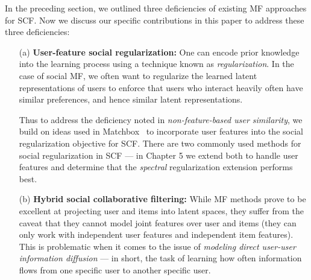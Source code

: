 In the preceding section, we outlined three deficiencies of existing MF
approaches for SCF.  Now we discuss our specific
contributions in this paper to address these three deficiencies:
\begin{enumerate}
\item[(a)] {\bf User-feature social regularization:} One can encode
prior knowledge into the learning process using a technique known as
\emph{regularization}.  In the case of social MF, we often want to
regularize the learned latent representations of users to enforce that
users who interact heavily often have similar preferences, and hence
similar latent representations.  

Thus to address the deficiency noted in
\emph{non-feature-based user similarity}, we build on ideas used in
Matchbox~\cite{matchbox} to incorporate user features into the social
regularization objective for SCF.  There are two commonly used methods
for social regularization in SCF --- in Chapter 5 we
extend both to handle user features and determine that the
\emph{spectral} regularization extension performs best.
\item[(b)] {\bf Hybrid social collaborative filtering:} While MF
methods prove to be excellent at projecting user and items into latent
spaces, they suffer from the caveat that they cannot model joint
features over user and items (they can only work with independent user
features and independent item features).  This is problematic when it
comes to the issue of \emph{modeling direct user-user information
diffusion} --- in short, the task of learning how often information
flows from one specific user to another specific user.  


\end{enumerate}
